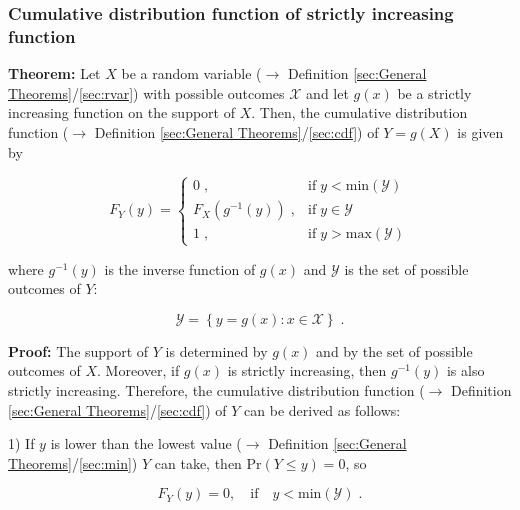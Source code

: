 \documentclass[a4paper,12pt,twoside]{book}
\begin{document}
\subsubsection[\textbf{Cumulative distribution function of strictly increasing function}]{Cumulative distribution function of strictly increasing function} \label{sec:cdf-sifct}
\setcounter{equation}{0}

\textbf{Theorem:} Let $X$ be a random variable ($\rightarrow$ Definition \ref{sec:General Theorems}/\ref{sec:rvar}) with possible outcomes $\mathcal{X}$ and let $g(x)$ be a strictly increasing function on the support of $X$. Then, the cumulative distribution function ($\rightarrow$ Definition \ref{sec:General Theorems}/\ref{sec:cdf}) of $Y = g(X)$ is given by

\begin{equation} \label{eq:cdf-sifct-cdf-sifct}
F_Y(y) = \left\{
\begin{array}{rl}
0 \; , & \text{if} \; y < \mathrm{min}(\mathcal{Y}) \\
F_X(g^{-1}(y)) \; , & \text{if} \; y \in \mathcal{Y} \\
1 \; , & \text{if} \; y > \mathrm{max}(\mathcal{Y})
\end{array}
\right.
\end{equation}

where $g^{-1}(y)$ is the inverse function of $g(x)$ and $\mathcal{Y}$ is the set of possible outcomes of $Y$:

\begin{equation} \label{eq:cdf-sifct-Y-range}
\mathcal{Y} = \left\lbrace y = g(x): x \in \mathcal{X} \right\rbrace \; .
\end{equation}


\vspace{1em}
\textbf{Proof:} The support of $Y$ is determined by $g(x)$ and by the set of possible outcomes of $X$. Moreover, if $g(x)$ is strictly increasing, then $g^{-1}(y)$ is also strictly increasing. Therefore, the cumulative distribution function ($\rightarrow$ Definition \ref{sec:General Theorems}/\ref{sec:cdf}) of $Y$ can be derived as follows:

1) If $y$ is lower than the lowest value ($\rightarrow$ Definition \ref{sec:General Theorems}/\ref{sec:min}) $Y$ can take, then $\mathrm{Pr}(Y \leq y) = 0$, so

\begin{equation} \label{eq:cdf-sifct-cdf-sifct-p1}
F_Y(y) = 0, \quad \text{if} \quad y < \mathrm{min}(\mathcal{Y}) \; .
\end{equation}
\end{document}
